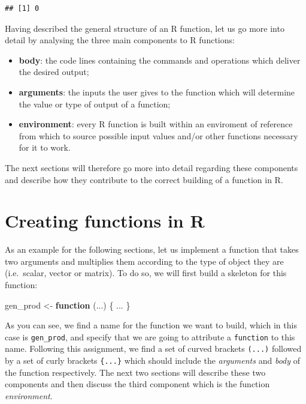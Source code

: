 \documentclass[12pt,]{krantz}
\newenvironment{Shaded}{\begin{snugshade}}{\end{snugshade}}
\newcommand{\DecValTok}[1]{\textcolor[rgb]{0.06,0.06,0.06}{#1}}
\newcommand{\StringTok}[1]{\textcolor[rgb]{0.5,0.5,0.5}{#1}}
\newcommand{\ControlFlowTok}[1]{\textcolor[rgb]{0.27,0.27,0.27}{\textbf{#1}}}
\newcommand{\OperatorTok}[1]{\textcolor[rgb]{0.43,0.43,0.43}{\textbf{#1}}}
\newcommand{\NormalTok}[1]{#1}
\providecommand{\tightlist}{%
  \setlength{\itemsep}{0pt}\setlength{\parskip}{0pt}}
\begin{document}
\begin{Shaded}
\end{Shaded}

\begin{verbatim}
## [1] 0
\end{verbatim}

Having described the general structure of an R function, let us go more
into detail by analysing the three main components to R functions:

\begin{itemize}
\tightlist
\item
  \textbf{body}: the code lines containing the commands and operations
  which deliver the desired output;
\item
  \textbf{arguments}: the inputs the user gives to the function which
  will determine the value or type of output of a function;
\item
  \textbf{environment}: every R function is built within an enviroment
  of reference from which to source possible input values and/or other
  functions necessary for it to work.
\end{itemize}

The next sections will therefore go more into detail regarding these
components and describe how they contribute to the correct building of a
function in R.

\section{Creating functions in R}\label{creating-functions-in-r}

As an example for the following sections, let us implement a function
that takes two arguments and multiplies them according to the type of
object they are (i.e.~scalar, vector or matrix). To do so, we will first
build a skeleton for this function:

\begin{Shaded}
\begin{Highlighting}[]
\NormalTok{gen_prod <-}\StringTok{ }\ControlFlowTok{function}\NormalTok{ (...) \{}
\NormalTok{  ...}
\NormalTok{\}}
\end{Highlighting}
\end{Shaded}

As you can see, we find a name for the function we want to build, which
in this case is \texttt{gen\_prod}, and specify that we are going to
attribute a \texttt{function} to this name. Following this assignment,
we find a set of curved brackets \texttt{(...)} followed by a set of
curly brackets \texttt{\{...\}} which should include the
\emph{arguments} and \emph{body} of the function respectively. The next
two sections will describe these two components and then discuss the
third component which is the function \emph{environment}.
\end{document}
